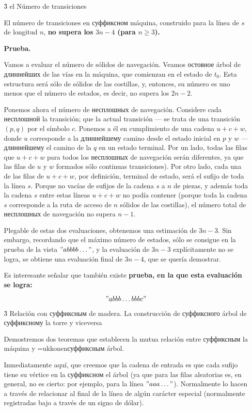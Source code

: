 \h3{ el Número de transiciones }

El número de transiciones en суффиксном máquina, construido para la línea de $s$ de longitud $n$, \bf{no supera los $3n-4$} (para $n \ge 3$).

\bf{Prueba}.

Vamos a evaluar el número de sólidos de navegación. Veamos остовное árbol de длиннейших de las vías en la máquina, que comienzan en el estado de $t_0$. Esta estructura será sólo de sólidos de las costillas, y, entonces, su número es uno menos que el número de estados, es decir, no supera los $2n-2$.

Ponemos ahora el número de несплошных de navegación. Considere cada несплошной la transición; que la actual transición --- se trata de una transición $(p,q)$ por el símbolo $c$. Ponemos a él en cumplimiento de una cadena $u+c+w$, donde $u$ corresponde a la длиннейшему camino desde el estado inicial en $p$ y $w$ --- длиннейшему el camino de la $q$ en un estado terminal. Por un lado, todas las filas que $u+c+w$ para todos los несплошных de navegación serán diferentes, ya que las filas de $u$ y $w$ formados sólo continuas transiciones). Por otro lado, cada una de las filas de $u+c+w$, por definición, terminal de estado, será el sufijo de toda la línea $s$. Porque no vacías de sufijos de la cadena $s$ a $n$ de piezas, y además toda la cadena $s$ entre estas líneas $u+c+w$ no podía contener (porque toda la cadena $s$ corresponde a la ruta de acceso de $n$ sólidos de las costillas), el número total de несплошных de navegación no supera $n-1$.

Plegable de estas dos evaluaciones, obtenemos una estimación de $3n-3$. Sin embargo, recordando que el máximo número de estados, sólo se consigue en la prueba de la vista $"abbbb \ldots "$, y la evaluación de $3n-3$ explícitamente no se logra, se obtiene una evaluación final de $3n-4$, que se quería demostrar.

Es interesante señalar que también existe \bf{prueba, en la que esta evaluación se logra}:

$$ "abbb \ldots bbbc" $$


\h3{ Relación con суффиксным de madera. La construcción de суффиксного árbol de суффиксному la torre y viceversa }

Demostremos dos teoremas que establecen la mutua relación entre суффиксным la máquina y \algohref=ukkonen{суффиксным árbol}.

Inmediatamente aquí, que creemos que la cadena de entrada es que cada sufijo tiene su vértice en la суффиксном el árbol (ya que para las filas aleatorias es, en general, no es cierto: por ejemplo, para la línea $"aaa \ldots"$). Normalmente lo hacen a través de relacionar al final de la línea de algún carácter especial (normalmente registradas bajo a través de un signo de dólar).

